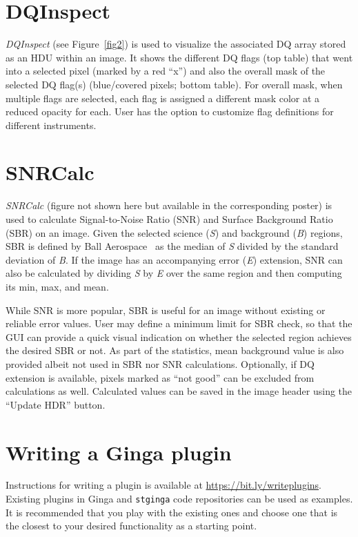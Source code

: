 \documentclass[11pt,twoside]{article}
\begin{document}
\section{DQInspect}

{\em DQInspect} (see Figure~\ref{fig2}) is used to visualize the associated DQ
array stored as an HDU within an image.
It shows the different DQ flags (top table) that went into a selected pixel
(marked by a red ``x'')
and also the overall mask of the selected DQ flag(s)
(blue/covered pixels; bottom table).
For overall mask, when multiple flags are selected, each flag is assigned a
different mask color at a reduced opacity for each.
User has the option to customize flag definitions for different instruments.


\section{SNRCalc}

{\em SNRCalc} (figure not shown here but available in the
corresponding poster) is used to calculate Signal-to-Noise Ratio
(SNR) and Surface Background Ratio (SBR) on an image.
Given the selected science ({\em S}) and background ({\em B}) regions,
SBR is defined by Ball Aerospace~\citep{sbr} as the median of {\em S}
divided by the standard deviation of {\em B}.
If the image has an accompanying error ({\em E}) extension, SNR can also
be calculated by dividing {\em S} by {\em E} over the same region and
then computing its min, max, and mean.

While SNR is more popular, SBR is useful for an image without existing or
reliable error values. User may define a minimum limit for SBR check,
so that the GUI can provide a quick visual indication on whether the
selected region achieves the desired SBR or not.
As part of the statistics, mean background value is also
provided albeit not used in SBR nor SNR calculations.
Optionally, if DQ extension is available, pixels marked as
``not good'' can be excluded from calculations as well.
Calculated values can be saved in the image header using the ``Update HDR''
button.\footnotemark[3]

\section{Writing a Ginga plugin}

Instructions for writing a plugin is available at
\url{https://bit.ly/writeplugins}.
Existing plugins in Ginga and {\tt stginga} code repositories can be used as
examples. It is recommended that you play with the existing ones and
choose one that is the closest to your desired functionality as a
starting point.
\end{document}
